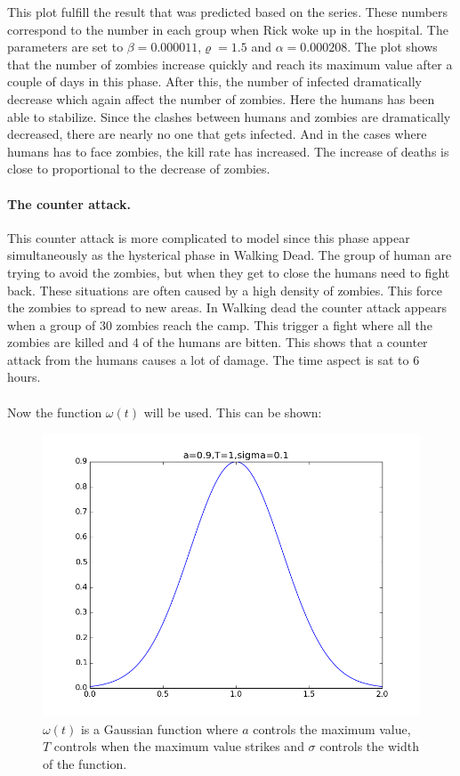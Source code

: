 \documentclass[%
twoside,                 %
final,                   %
10pt]{article}
\begin{document}
This plot fulfill the result that was predicted based on the series. These numbers correspond to the number in each group when Rick woke up in the hospital. The parameters are set to $\beta = 0.000011$,$\varrho = 1.5$ and $\alpha = 0.000208$. The plot shows that the number of zombies increase quickly and reach its maximum value after a couple of days in this phase. After this, the number of infected dramatically decrease which again affect the number of zombies. Here the humans has been able to stabilize. Since the clashes between humans and zombies are dramatically decreased, there are nearly no one that gets infected. And in the cases where humans has to face zombies, the kill rate has increased. The increase of deaths is close to proportional to the decrease of zombies.

\paragraph{The counter attack.}
This counter attack is more complicated to model since this phase appear simultaneously as the hysterical phase in Walking Dead. The group of human are trying to avoid the zombies, but when they get to close the humans need to fight back. These situations are often caused by a high density of zombies. This force the zombies to spread to new areas. In Walking dead the counter attack appears when a group of 30 zombies reach the camp. This trigger a fight where all the zombies are killed and 4 of the humans are bitten. This shows that a counter attack from the humans causes a lot of damage. The time aspect is sat to 6 hours.  
\\
\\
Now the function $\omega(t)$ will be used. This can be shown:


\begin{figure}[ht]
  \centerline{\includegraphics[width=0.9\linewidth]{plots/omega_function.png}}
  \caption{
  $\omega (t)$ is a Gaussian function where $a$ controls the maximum value, $T$ controls when the maximum value strikes and $\sigma$ controls the width of the function.
  }
\end{figure}
\end{document}
